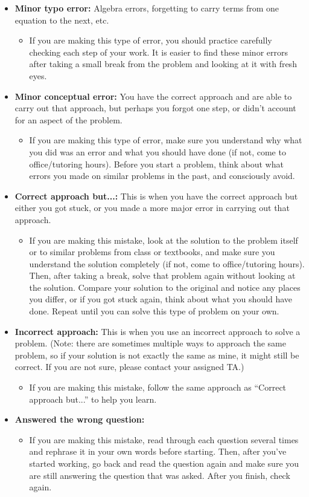 \documentclass[12pt]{article}
\theoremstyle{definition}
\begin{document}
\begin{itemize}
\item \textbf{Minor typo error:} Algebra errors, forgetting to carry terms from one equation to the next, etc. 
\begin{itemize}
\item If you are making this type of error, you should practice carefully checking each step of your work. It is easier to find these minor errors after taking a small break from the problem and looking at it with fresh eyes.
\end{itemize}
\item \textbf{Minor conceptual error:} You have the correct approach and are able to carry out that approach, but perhaps you forgot one step, or didn't account for an aspect of the problem. 
\begin{itemize}
\item If you are making this type of error, make sure you understand why what you did was an error and what you should have done (if not, come to office/tutoring hours). Before you start a problem, think about what errors you made on similar problems in the past, and consciously avoid.
\end{itemize}
\item \textbf{Correct approach but...:} This is when you have the correct approach but either you got stuck, or you made a more major error in carrying out that approach. 
\begin{itemize}
\item If you are making this mistake, look at the solution to the problem itself or to similar problems from class or textbooks, and make sure you understand the solution completely (if not, come to office/tutoring hours). Then, after taking a break, solve that problem again without looking at the solution. Compare your solution to the original and notice any places you differ, or if you got stuck again, think about what you should have done. Repeat until you can solve this type of problem on your own.
\end{itemize}
\item \textbf{Incorrect approach:} This is when you use an incorrect approach to solve a problem. (Note: there are sometimes multiple ways to approach the same problem, so if your solution is not exactly the same as mine, it might still be correct. If you are not sure, please contact your assigned TA.)
\begin{itemize}
 \item If you are making this mistake, follow the same approach as ``Correct approach but...'' to help you learn.
 \end{itemize} 
\item \textbf{Answered the wrong question:} 
\begin{itemize}
\item If you are making this mistake, read through each question several times and rephrase it in your own words before starting. Then, after you've started working, go back and read the question again and make sure you are still answering the question that was asked. After you finish, check again.
\end{itemize}
\end{itemize}
\end{document}
